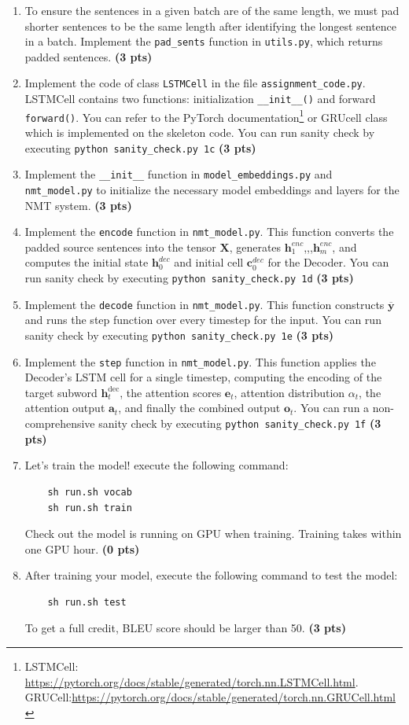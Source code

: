 \documentclass{assignment format}
\newcommand{\hdec}{\mathbf{h}^{\text{dec}}}
\begin{document}
\begin{enumerate}[label=(\alph*)]

    \item To ensure the sentences in a given batch are of the same length, we must pad shorter sentences to be the same length after identifying the longest sentence in a batch. Implement the \texttt{pad\_sents} function in \texttt{utils.py}, which returns padded sentences. \textbf{(3 pts)}
    \item Implement the code of class \texttt{LSTMCell} in the file \texttt{assignment\_code.py}. LSTMCell contains two functions: initialization \texttt{\_\_init\_\_()} and forward \texttt{forward()}. You can refer to the PyTorch documentation\footnote{LSTMCell: \url{https://pytorch.org/docs/stable/generated/torch.nn.LSTMCell.html}. GRUCell:\url{https://pytorch.org/docs/stable/generated/torch.nn.GRUCell.html}} or GRUcell class which is implemented on the skeleton code. You can run sanity check by executing \texttt{python sanity\_check.py 1c} \textbf{(3 pts)}
   \item Implement the \texttt{\_\_init\_\_} function in \texttt{model\_embeddings.py} and \texttt{nmt\_model.py} to initialize the necessary model embeddings and layers for the NMT system. \textbf{(3 pts)}
   
    \item Implement the \texttt{encode} function in \texttt{nmt\_model.py}. This function converts the padded source sentences into the tensor $\mathbf{X}$, generates $\mathbf{h}^{enc}_1$,,,$\mathbf{h}^{enc}_m$, and computes the initial state $\mathbf{h}^{dec}_0$ and initial cell $\mathbf{c}^{dec}_0$ for the Decoder. You can run sanity check by executing \texttt{python sanity\_check.py 1d} \textbf{(3 pts)}
    \item Implement the \texttt{decode} function in \texttt{nmt\_model.py}. This function constructs $\overline{\mathbf{y}}$ 
    and runs the step function over every timestep for the input. You can run sanity check by executing \texttt{python sanity\_check.py 1e} \textbf{(3 pts)}
    \item Implement the \texttt{step} function in \texttt{nmt\_model.py}. This function applies the Decoder's LSTM cell for a single timestep, computing the encoding of the target subword $\hdec_t$, the attention scores $\mathbf{e}_t$, attention distribution $\alpha_t$, the attention output $\mathbf{a}_{t}$, and finally the combined output $\mathbf{o}_t$. You can run a non-comprehensive sanity check by executing \texttt{python sanity\_check.py 1f}  \textbf{(3 pts)}
\item Let's train the model! execute the following command:
\begin{verbatim}
    sh run.sh vocab
    sh run.sh train
\end{verbatim}
Check out the model is running on GPU when training. Training takes within one GPU hour. \textbf{(0 pts)}
    \item After training your model, execute the following command to test the model:
\begin{verbatim}
    sh run.sh test
\end{verbatim}
    To get a full credit, BLEU score should be larger than 50. \textbf{(3 pts)}
    

\end{enumerate}
\end{document}
